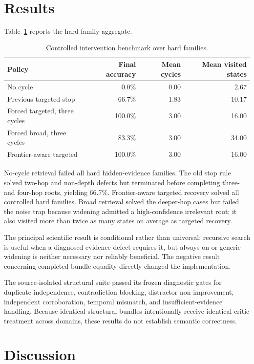\documentclass[10pt]{article}
\begin{document}
\section{Results}
Table~\ref{tab:intervention} reports the hard-family aggregate.

\begin{table}[h]
\centering
\caption{Controlled intervention benchmark over hard families.}
\label{tab:intervention}
\begin{tabular}{lrrr}
\toprule
Policy & Final accuracy & Mean cycles & Mean visited states \\
\midrule
No cycle & 0.0\% & 0.00 & 2.67 \\
Previous targeted stop & 66.7\% & 1.83 & 10.17 \\
Forced targeted, three cycles & 100.0\% & 3.00 & 16.00 \\
Forced broad, three cycles & 83.3\% & 3.00 & 34.00 \\
Frontier-aware targeted & 100.0\% & 3.00 & 16.00 \\
\bottomrule
\end{tabular}
\end{table}

No-cycle retrieval failed all hard hidden-evidence families. The old stop rule solved two-hop and non-depth defects but terminated before completing three- and four-hop roots, yielding 66.7\%. Frontier-aware targeted recovery solved all controlled hard families. Broad retrieval solved the deeper-hop cases but failed the noise trap because widening admitted a high-confidence irrelevant root; it also visited more than twice as many states on average as targeted recovery.

The principal scientific result is conditional rather than universal: recursive search is useful when a diagnosed evidence defect requires it, but always-on or generic widening is neither necessary nor reliably beneficial. The negative result concerning completed-bundle equality directly changed the implementation.

The source-isolated structural suite passed its frozen diagnostic gates for duplicate independence, contradiction blocking, distractor non-improvement, independent corroboration, temporal mismatch, and insufficient-evidence handling. Because identical structural bundles intentionally receive identical critic treatment across domains, these results do not establish semantic correctness.

\section{Discussion}
\end{document}
